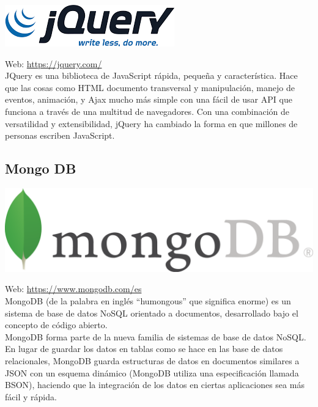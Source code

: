 \begin{center}
\includegraphics[scale=0.6]{imagenes/jquery-logo.png}
\end{center}

Web: \url{https://jquery.com/}\\

JQuery es una biblioteca de JavaScript rápida, pequeña y característica. Hace que las cosas como HTML documento transversal y manipulación, manejo de eventos, animación, y Ajax mucho más simple con una fácil de usar API que funciona a través de una multitud de navegadores. Con una combinación de versatilidad y extensibilidad, jQuery ha cambiado la forma en que millones de personas escriben JavaScript.\\


\subsection{Mongo DB}

\begin{center}
\includegraphics[scale=0.5]{imagenes/mongodb-logo.png}
\end{center}


Web: \url{https://www.mongodb.com/es}\\

MongoDB (de la palabra en inglés “humongous” que significa enorme) es un sistema de base de datos NoSQL orientado a documentos, desarrollado bajo el concepto de código abierto.\\

MongoDB forma parte de la nueva familia de sistemas de base de datos NoSQL. En lugar de guardar los datos en tablas como se hace en las base de datos relacionales, MongoDB guarda estructuras de datos en documentos similares a JSON con un esquema dinámico (MongoDB utiliza una especificación llamada BSON), haciendo que la integración de los datos en ciertas aplicaciones sea más fácil y rápida.\\


